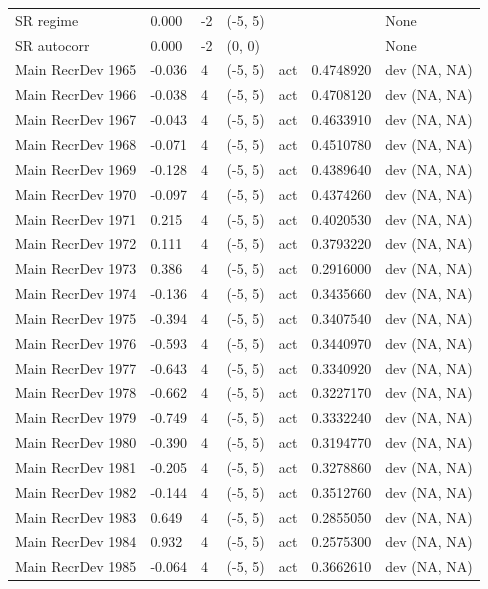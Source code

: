 \documentclass[11pt,
  english,
  a4paper,
]{article}
\begin{document}
\begin{landscape}
\begin{longtable}[t]{>{\raggedright\arraybackslash}p{8.5cm}lllll>{\raggedright\arraybackslash}p{4cm}}
SR regime & 0.000 & -2 & (-5, 5) &  &  & None\\
SR autocorr & 0.000 & -2 & (0, 0) &  &  & None\\
Main RecrDev 1965 & -0.036 & 4 & (-5, 5) & act & 0.4748920 & dev (NA, NA)\\
Main RecrDev 1966 & -0.038 & 4 & (-5, 5) & act & 0.4708120 & dev (NA, NA)\\
Main RecrDev 1967 & -0.043 & 4 & (-5, 5) & act & 0.4633910 & dev (NA, NA)\\
Main RecrDev 1968 & -0.071 & 4 & (-5, 5) & act & 0.4510780 & dev (NA, NA)\\
Main RecrDev 1969 & -0.128 & 4 & (-5, 5) & act & 0.4389640 & dev (NA, NA)\\
Main RecrDev 1970 & -0.097 & 4 & (-5, 5) & act & 0.4374260 & dev (NA, NA)\\
Main RecrDev 1971 & 0.215 & 4 & (-5, 5) & act & 0.4020530 & dev (NA, NA)\\
Main RecrDev 1972 & 0.111 & 4 & (-5, 5) & act & 0.3793220 & dev (NA, NA)\\
Main RecrDev 1973 & 0.386 & 4 & (-5, 5) & act & 0.2916000 & dev (NA, NA)\\
Main RecrDev 1974 & -0.136 & 4 & (-5, 5) & act & 0.3435660 & dev (NA, NA)\\
Main RecrDev 1975 & -0.394 & 4 & (-5, 5) & act & 0.3407540 & dev (NA, NA)\\
Main RecrDev 1976 & -0.593 & 4 & (-5, 5) & act & 0.3440970 & dev (NA, NA)\\
Main RecrDev 1977 & -0.643 & 4 & (-5, 5) & act & 0.3340920 & dev (NA, NA)\\
Main RecrDev 1978 & -0.662 & 4 & (-5, 5) & act & 0.3227170 & dev (NA, NA)\\
Main RecrDev 1979 & -0.749 & 4 & (-5, 5) & act & 0.3332240 & dev (NA, NA)\\
Main RecrDev 1980 & -0.390 & 4 & (-5, 5) & act & 0.3194770 & dev (NA, NA)\\
Main RecrDev 1981 & -0.205 & 4 & (-5, 5) & act & 0.3278860 & dev (NA, NA)\\
Main RecrDev 1982 & -0.144 & 4 & (-5, 5) & act & 0.3512760 & dev (NA, NA)\\
Main RecrDev 1983 & 0.649 & 4 & (-5, 5) & act & 0.2855050 & dev (NA, NA)\\
Main RecrDev 1984 & 0.932 & 4 & (-5, 5) & act & 0.2575300 & dev (NA, NA)\\
Main RecrDev 1985 & -0.064 & 4 & (-5, 5) & act & 0.3662610 & dev (NA, NA)\\

\end{longtable}
\end{landscape}
\end{document}
